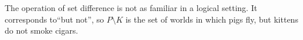 The operation of set difference is not as familiar in a logical setting. 
It corresponds to``but not'', so $P\setminus K$ is the set of worlds  in which pigs fly, but kittens do not smoke cigars. 
 
%
%

